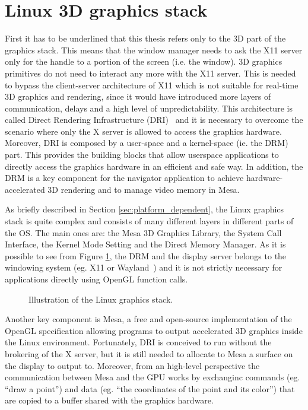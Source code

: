\section{Linux 3D graphics stack}
First it has to be underlined that this thesis refers only to the 3D part of the
graphics stack. This means that the window manager needs to ask the X11 server
only for the handle to a portion of the screen (i.e. the window).
3D graphics primitives do not need to interact any more with the X11 server. This
is needed to bypass the client-server architecture of X11 which is not suitable for
real-time 3D graphics and rendering, since it would have introduced more layers
of communication, delays and a high level of unpredictability.
This architecture is called
Direct Rendering Infrastructure (DRI)~\cite{paul2000introduction} and it is
necessary to overcome the scenario where only the X server is allowed to access
the graphics hardware. Moreover, DRI is composed by a user-space and a kernel-space
(ie. the DRM) part. This provides the building blocks that allow userspace applications
to directly access the graphics hardware in an efficient and safe way.
In addition, the DRM is a key component for the navigator application to achieve
hardware-accelerated 3D rendering and to manage video memory in Mesa.

As briefly described in Section \ref{sec:platform_dependent}, the Linux graphics
stack is quite complex and consists of many different layers in different parts
of the OS. The main ones are: the Mesa 3D Graphics Library, the System Call
Interface, the Kernel Mode Setting and the Direct Memory Manager.
As it is possible to see from Figure \ref{img:linux_graphics_stack}, the DRM and 
the display server belongs to the windowing system (eg. X11 or Wayland~\cite{wayland}) 
and it is not strictly necessary for applications directly using OpenGL function
calls.
\begin{figure}[!htb]
    \caption{Illustration of the Linux graphics stack.}
    \label{img:linux_graphics_stack}
\end{figure} 

Another key component is Mesa, a free and open-source implementation of the
OpenGL specification allowing
programs to output accelerated 3D graphics inside the Linux environment. Fortunately,
DRI is conceived to run without the brokering of the X server, but it is still
needed to allocate to Mesa a surface on the display to output to. Moreover, from
an high-level perspective the communication between Mesa and the GPU works by
exchanginc commands (eg. ``draw a point'') and data (eg. ``the coordinates of the
point and its color'') that are copied to a buffer shared with the graphics hardware.



